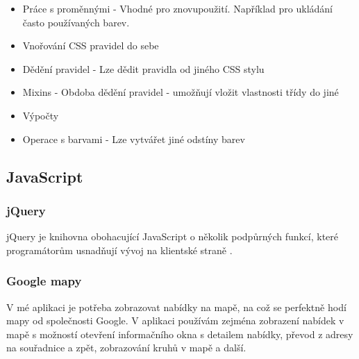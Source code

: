 \begin{itemize}
    \item Práce s proměnnými - Vhodné pro znovupoužití. Například pro ukládání často používaných barev.
	\item Vnořování CSS pravidel do sebe
	\item Dědění pravidel - Lze dědit pravidla od jiného CSS stylu
	\item Mixins - Obdoba dědění pravidel - umožňují vložit vlastnosti třídy do jiné
	\item Výpočty
	\item Operace s barvami - Lze vytvářet jiné odstíny barev
\end{itemize}

\subsection{JavaScript}

\subsubsection{jQuery}
jQuery je knihovna obohacující JavaScript o několik podpůrných funkcí, které programátorům usnadňují vývoj na klientské straně \cite{jquery}.

\subsubsection{Google mapy}
V mé aplikaci je potřeba zobrazovat nabídky na mapě, na což se perfektně hodí mapy od společnosti Google. V aplikaci používám zejména zobrazení nabídek v mapě s možností otevření informačního okna s detailem nabídky, převod z adresy na souřadnice a zpět, zobrazování kruhů v mapě a další.